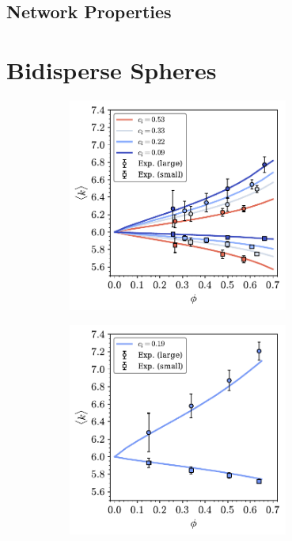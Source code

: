 \subsection{Network Properties}

\section{Bidisperse Spheres}

\begin{figure}[bt]
     \centering
     
      \begin{subfigure}[b]{0.45\textwidth}
         \centering
         \includegraphics[height=7cm]{./figures/quasi2d/bi_ssr_phi_k.pdf}
         \caption{}
         \label{fig:bi1}
     \end{subfigure}
     \hfill
      \begin{subfigure}[b]{0.45\textwidth}
         \centering
         \includegraphics[height=7cm]{./figures/quasi2d/bi_lsr_phi_k.pdf}
         \caption{}
         \label{fig:bi2}
     \end{subfigure}
     \hfill
     

\end{figure}
